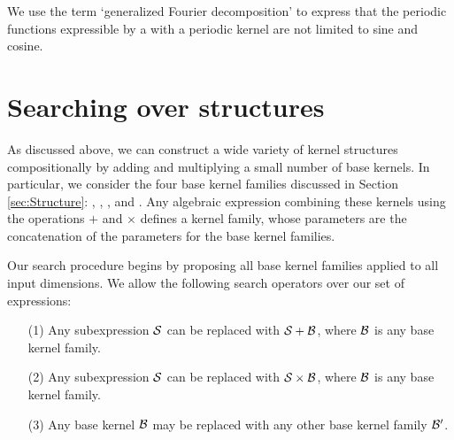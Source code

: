 \documentclass[twoside]{article}
\renewcommand{\TBD}[1]{}
\begin{document}
We use the term `generalized Fourier decomposition' to express that the periodic functions expressible by a \gp{} with a periodic kernel are not limited to sine and cosine.




%





\section{Searching over structures}
\label{sec:Search}

As discussed above, we can construct a wide variety of kernel structures compositionally by adding and multiplying a small number of base kernels.
In particular, we consider the four base kernel families discussed in Section \ref{sec:Structure}: \kSE, \kPer, \kLin, and \kRQ.
Any algebraic expression combining these kernels using the operations $+$ and $\times$ defines a kernel family, whose parameters are the concatenation of the parameters for the base kernel families. 

Our search procedure begins by proposing all base kernel families applied to all input dimensions. 
We allow the following search operators over our set of expressions:
\begin{itemize}
\item[(1)] Any subexpression ${\cal S}$ can be replaced with ${\cal S} + {\cal B}$, where ${\cal B}$ is any base kernel family.
\item[(2)] Any subexpression ${\cal S}$ can be replaced with ${\cal S} \times {\cal B}$, where ${\cal B}$ is any base kernel family.
\item[(3)] Any base kernel ${\cal B}$ may be replaced with any other base kernel family ${\cal B}^\prime$.
\end{itemize}
\end{document}
